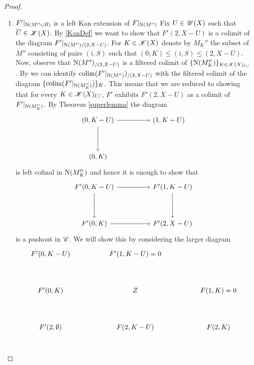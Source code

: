 \documentclass[../../thesis.tex]{subfiles}
\begin{document}
\begin{proof}
\begin{enumerate}[label=(\alph*)]
        \item $F'|_{\mathrm{N}(M'' \cup B)}$ is a left Kan extension of $F|_{\mathrm{N}(M'')}$
              Fix $U \in \mathscr{U}(X)$ such that $\overline{U} \in \mathscr{K}(X)$. By \ref{KanDef} we want to show that $F'(2, X-U)$ is a colimit of the diagram $F'|_{\mathrm{N}(M'')/(2,X-U)}$.
              For $K \in \mathscr{K}(X)$ denote by $M_K''$ the subset of $M''$ consisting of pairs $(i,S)$ such that $(0,K)\leq (i,S) \leq (2,X-U)$.
              Now, observe that $\mathrm{N}(M'')_{/(2,X-U)}$ is a filtered colimit of $\{\mathrm{N}(M_K'')\}_{K\in \mathscr{K}(X)_{U/}}$.
              By \cite[4.2.3]{HTT} we can identify $\operatorname{colim}(F'|_{\mathrm{N}(M'')})_{/(2,X-U)}$ with the filtered colimit of the diagram $\{\operatorname{colim}(F'|_{\mathrm{N}(M_K'')})\}_K$.
              This means that we are reduced to showing that for every $K \in \mathscr{K}(X)_{U/}$, $F'$ exhibits $F'(2,X-U)$ as a colimit of $F'|_{\mathrm{N}(M_K'')}$.
              By Theorem \ref{superlemma} the diagram
              \[\begin{tikzcd}
                      {(0,K-U)} && {(1,K-U)} \\
                      \\
                      {(0,K)}
                      \arrow[from=1-1, to=1-3]
                      \arrow[from=1-1, to=3-1]
                  \end{tikzcd}\]
              is left cofinal in $\mathrm{N}(M_K'')$ and hence it is enough to show that
              \[\begin{tikzcd}
                      {F'(0,K-U)} && {F'(1,K-U)} \\
                      \\
                      {F'(0,K)} && {F'(2,X-U)}
                      \arrow[from=1-1, to=1-3]
                      \arrow[from=1-1, to=3-1]
                      \arrow[from=1-3, to=3-3]
                      \arrow[from=3-1, to=3-3]
                  \end{tikzcd}\]
              is a pushout in $\mathscr{C}$.
              We will show this by considering the larger diagram
              \[\begin{tikzcd}
                      {F'(0,K-U)} && {F'(1,K-U) = 0} \\
                      \\
                      {F'(0,K)} && Z && {F(1,K) = 0} \\
                      \\
                      {F'(2,\emptyset)} && {F(2,K-U)} && {F(2,K)} \\

\end{tikzcd}\]
\end{enumerate}
\end{proof}
\end{document}
